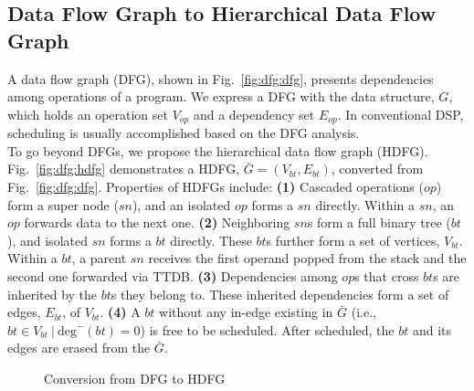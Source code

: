 \subsection{Data Flow Graph to Hierarchical Data Flow Graph}
\label{sec:hdfg}
A data flow graph (DFG), shown in Fig.~\ref{fig:dfg:dfg}, presents dependencies among operations of a program.
We express a DFG with the data structure, $G$, which holds an operation set $V_{op}$ and a dependency set $E_{op}$.
In conventional DSP, scheduling is usually accomplished based on the DFG analysis.
\\\indent
To go beyond DFGs, we propose the hierarchical data flow graph (HDFG).
Fig.~\ref{fig:dfg:hdfg} demonstrates a HDFG, $\bar{G} = (V_{bt}, E_{bt})$, converted from Fig.~\ref{fig:dfg:dfg}.
Properties of HDFGs include: 
\textbf{(1)} Cascaded operations ($op$) form a super node ($sn$), and an isolated $op$ forms a $sn$ directly. 
Within a $sn$, an $op$ forwards data to the next one.
\textbf{(2)} Neighboring $sn$s form a full binary tree ($bt$), and isolated $sn$ forms a $bt$ directly.
These $bt$s further form a set of vertices, $V_{bt}$.
Within a $bt$, a parent $sn$ receives the first operand popped from the stack and the second one forwarded via TTDB.
\textbf{(3)} Dependencies among $op$s that cross $bt$s are inherited by the $bt$s they belong to.
These inherited dependencies form a set of edges, $E_{bt}$, of $V_{bt}$.
\textbf{(4)} A $bt$ without any in-edge existing in $\bar{G}$ (i.e., $bt \in V_{bt}\ |\ \textrm{deg}^-(bt) = 0$) is free to be scheduled. 
After scheduled, the $bt$ and its edges are erased from the $\bar{G}$.%
\setlength{\textfloatsep}{10pt}%
\begin{figure}[t]
\begin{center}
%
\hspace{0.5em}
\end{center}
\caption{Conversion from DFG to HDFG}
\label{fig:dfg}
\end{figure}
